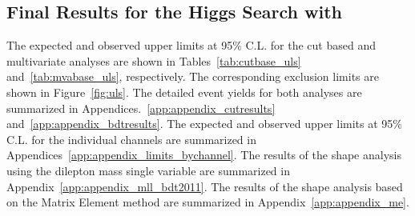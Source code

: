 \clearpage
\subsection{Final Results for the Higgs Search with \intlumiEightTeV{}}
\label{sec:search_results}

The expected and observed upper limits at 95\% C.L. for the cut based and
multivariate analyses are shown in Tables~\ref{tab:cutbase_uls}
and~\ref{tab:mvabase_uls}, respectively. The corresponding exclusion
limits are shown in Figure~\ref{fig:uls}. The detailed event yields 
for both analyses are summarized in Appendices.~\ref{app:appendix_cutresults} 
and~\ref{app:appendix_bdtresults}. 
The expected and observed upper limits at 95\% C.L. for the individual channels 
are summarized in Appendices~\ref{app:appendix_limits_bychannel}. 
The results of the shape analysis using the dilepton mass single variable are 
summarized in Appendix~\ref{app:appendix_mll_bdt2011}.
The results of the shape analysis based on the Matrix Element method 
are summarized in Appendix~\ref{app:appendix_me}. 

